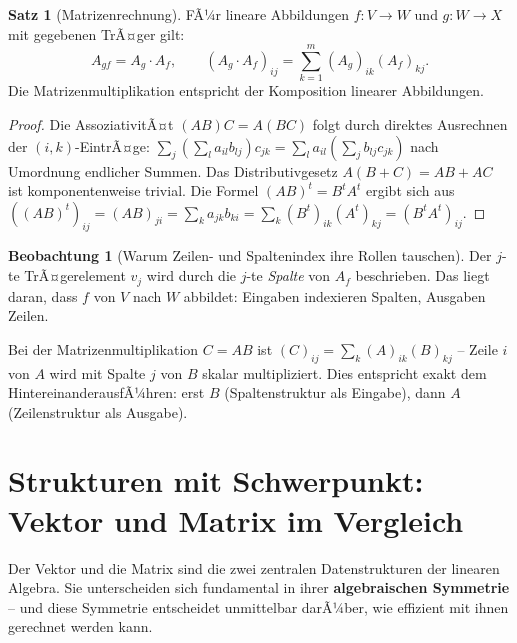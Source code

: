﻿\documentclass[a4paper,12pt]{report}
\theoremstyle{definition}
\newtheorem{satz}{Satz}
\newtheorem{beobachtung}{Beobachtung}
\begin{document}
\begin{satz}[Matrizenrechnung]
    FÃ¼r lineare Abbildungen $f : V \to W$ und $g : W \to X$ mit gegebenen
    TrÃ¤ger gilt:
    \[
        A_{gf} = A_g \cdot A_f, \qquad (A_g \cdot A_f)_{ij}
        = \sum_{k=1}^{m} (A_g)_{ik} (A_f)_{kj}.
    \]
    Die Matrizenmultiplikation entspricht der Komposition linearer Abbildungen.
\end{satz}
\begin{proof}
    Die AssoziativitÃ¤t $(AB)C = A(BC)$ folgt durch direktes Ausrechnen der
    $(i,k)$-EintrÃ¤ge: $\sum_j (\sum_l a_{il} b_{lj}) c_{jk} = \sum_l a_{il}
    (\sum_j b_{lj} c_{jk})$ nach Umordnung endlicher Summen.
    Das Distributivgesetz $A(B+C) = AB + AC$ ist komponentenweise trivial.
    Die Formel $(AB)^t = B^t A^t$ ergibt sich aus $((AB)^t)_{ij} = (AB)_{ji}
    = \sum_k a_{jk} b_{ki} = \sum_k (B^t)_{ik} (A^t)_{kj} = (B^t A^t)_{ij}$.
\end{proof}


\begin{beobachtung}[Warum Zeilen- und Spaltenindex ihre Rollen tauschen]
    Der $j$-te TrÃ¤gerelement $v_j$ wird durch die $j$-te \emph{Spalte} von $A_f$
    beschrieben. Das liegt daran, dass $f$ von $V$ nach $W$ abbildet:
    Eingaben indexieren Spalten, Ausgaben Zeilen.

    Bei der Matrizenmultiplikation $C = AB$ ist $(C)_{ij} = \sum_k (A)_{ik}(B)_{kj}$
    -- Zeile $i$ von $A$ wird mit Spalte $j$ von $B$ skalar multipliziert.
    Dies entspricht exakt dem HintereinanderausfÃ¼hren: erst $B$ (Spaltenstruktur
    als Eingabe), dann $A$ (Zeilenstruktur als Ausgabe).
\end{beobachtung}

\section{Strukturen mit Schwerpunkt: Vektor und Matrix im Vergleich}

Der Vektor und die Matrix sind die zwei zentralen Datenstrukturen der
linearen Algebra. Sie unterscheiden sich fundamental in ihrer
\textbf{algebraischen Symmetrie} -- und diese Symmetrie entscheidet
unmittelbar darÃ¼ber, wie effizient mit ihnen gerechnet werden kann.
\end{document}
